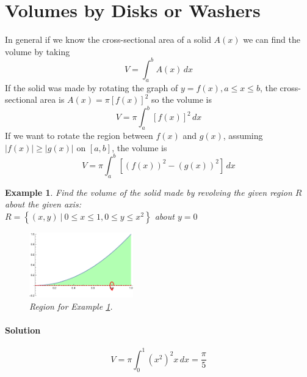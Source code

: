 \documentclass[letterpaper, 11pt, openany]{book}
\theoremstyle{mytheoremstyle}
\theoremstyle{myexamplestyle}
\newtheorem{example}{Example}[section]
\newenvironment{solution}{\paragraph{\sffamily \smaller \fontseries{b}\selectfont Solution}}{\hfill\faSquare}
\begin{document}
\section{Volumes by Disks or Washers}
\setcounter{figure}{0}

    In general if we know the cross-sectional area of a solid $A(x)$ we can find the volume by taking
    \[V = \int_{a}^{b} A(x) \, dx\]
    If the solid was made by rotating the graph of $y = f(x), a\leq x \leq b$, the cross-sectional area is $A(x) = \pi [f(x)]^{2}$ so the volume is
    \[V = \pi \int_{a}^{b} [f(x)]^{2} \, dx\]
    If we want to rotate the region between $f(x)$ and $g(x)$, assuming $|f(x)| \geq |g(x)|$ on $[a,b]$, the volume is
    \[V = \pi \int_{a}^{b} \left[ (f(x))^{2} - (g(x))^{2} \right]\, dx\]

\begin{example}
    \label{e:volcsparabola} Find the volume of the solid made by revolving the given region $R$ about the given axis: \\$R = \left\{ (x,y) \ | \ 0 \leq x \leq 1, 0 \leq y \leq x^{2} \right\}$ about $y = 0$
    
    \begin{figure}[htbp]
    \centering
        \includegraphics[width=0.4\textwidth]{Figures/volcsparabola.pdf}
    \caption{Region for Example \ref{e:volcsparabola}.}
    \label{f:volcsparabola}
    \end{figure}    
    
    \begin{solution}
        \[V = \pi \int_{0}^{1} (x^{2})^{2} x \, dx = \frac{\pi}{5}\]
    \end{solution}
\end{example}
\end{document}
